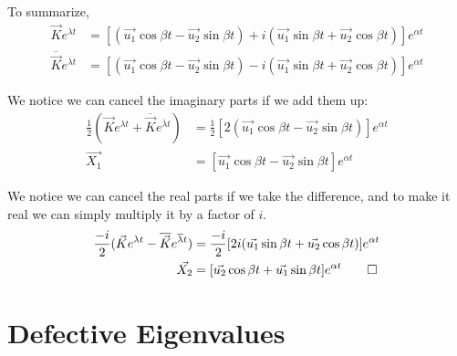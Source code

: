 \documentclass[11pt, oneside]{article}
\theoremstyle{plain}
\theoremstyle{definition}
\begin{document}
To summarize,
\begin{align*}
  \vec{K} e^{\lambda t} &= [(\vec{u_1} \cos{\beta t} - \vec{u_2} \sin{\beta t})
                        + i (\vec{u_1} \sin{\beta t} + \vec{u_2} \cos{\beta t})] e^{\alpha t} \\
\overline{\vec{K}} e^{\overline{\lambda} t}
                        &= [(\vec{u_1} \cos{\beta t} - \vec{u_2} \sin{\beta t})
                        - i (\vec{u_1} \sin{\beta t} + \vec{u_2} \cos{\beta t})] e^{\alpha t}
\end{align*}

We notice we can cancel the imaginary parts if we add them up:
\begin{align*}
  \frac{1}{2}(\vec{K} e^{\lambda t} + \overline{\vec{K}} e^{\overline{\lambda} t}) &= 
  \frac{1}{2}[2(\vec{u_1} \cos{\beta t} - \vec{u_2} \sin{\beta t})]e^{\alpha t} \\
  \vec{X_1} &= [\vec{u_1} \cos{\beta t} - \vec{u_2} \sin{\beta t}] e^{\alpha t}
\end{align*}

We notice we can cancel the real parts if we take the difference, and to make
it real we can simply multiply it by a factor of \( i \).
\begin{align*}
  \frac{-i}{2}(\vec{K} e^{\lambda t} - \overline{\vec{K}} e^{\overline{\lambda} t}) &= 
  \frac{-i}{2}[2i(\vec{u_1} \sin{\beta t} + \vec{u_2} \cos{\beta t})]e^{\alpha t} \\
  \vec{X_2} &= [\vec{u_2} \cos{\beta t} + \vec{u_1} \sin{\beta t}] e^{\alpha t} \qed
\end{align*}

\section{Defective Eigenvalues}
\end{document}
